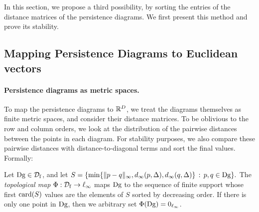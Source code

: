 In this section, we propose a third possibility, by sorting the entries of
the distance matrices of the persistence diagrams.
We first present this method %
and prove its stability. %


\subsection{Mapping Persistence Diagrams to Euclidean vectors}
\label{sec:Vectors}


\paragraph*{Persistence diagrams as metric spaces.} 
To map the persistence diagrams to $\mathbb{R}^D$, we treat the diagrams themselves as finite metric spaces, 
and consider their distance matrices. To be oblivious to the row and column orders, 
we look at the distribution of the pairwise distances 
between the points in each diagram. For stability purposes, we also compare these pairwise distances 
with distance-to-diagonal terms and sort the final values.
Formally:
%
% 

\begin{defin}\label{def:MappingSeq}
Let $\mathrm{Dg}\in{\mathcal D}_{\rm f}$, and let
$S=\{\min\{\|p-q\|_\infty,d_\infty(p,\Delta), d_\infty(q,\Delta)\}\,:\,p,q\in\mathrm{Dg}\}.$
The {\em topological map} $\Phi:{\mathcal D}_{\rm f}\rightarrow \ell_\infty$ %
maps $\mathrm{Dg}$ to the sequence of finite support whose first ${\rm card}(S)$ values are the elements of $S$
sorted by decreasing order. 
%
If there is only one point in $\mathrm{Dg}$, then we arbitrary set $\Phi(\mathrm{Dg})=0_{\ell_\infty}$.
\end{defin}

